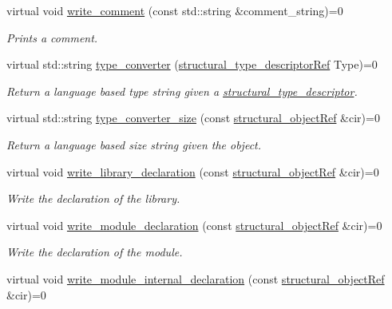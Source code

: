\begin{DoxyCompactItemize}
virtual void \hyperlink{classlanguage__writer_acb35eb2c22883fcf1f479a091dc4429d}{write\+\_\+comment} (const std\+::string \&comment\+\_\+string)=0
\begin{DoxyCompactList}\small\item\em Prints a comment. \end{DoxyCompactList}\item 
virtual std\+::string \hyperlink{classlanguage__writer_a1ac884fda2f8990edf61f914af7b04dd}{type\+\_\+converter} (\hyperlink{structural__objects_8hpp_a219296792577e3292783725961506c83}{structural\+\_\+type\+\_\+descriptor\+Ref} Type)=0
\begin{DoxyCompactList}\small\item\em Return a language based type string given a \hyperlink{structstructural__type__descriptor}{structural\+\_\+type\+\_\+descriptor}. \end{DoxyCompactList}\item 
virtual std\+::string \hyperlink{classlanguage__writer_a154f45ed77a5dff96d190b4e1ccfa366}{type\+\_\+converter\+\_\+size} (const \hyperlink{structural__objects_8hpp_a8ea5f8cc50ab8f4c31e2751074ff60b2}{structural\+\_\+object\+Ref} \&cir)=0
\begin{DoxyCompactList}\small\item\em Return a language based size string given the object. \end{DoxyCompactList}\item 
virtual void \hyperlink{classlanguage__writer_ab43debc2245af8078bb36b157d780aca}{write\+\_\+library\+\_\+declaration} (const \hyperlink{structural__objects_8hpp_a8ea5f8cc50ab8f4c31e2751074ff60b2}{structural\+\_\+object\+Ref} \&cir)=0
\begin{DoxyCompactList}\small\item\em Write the declaration of the library. \end{DoxyCompactList}\item 
virtual void \hyperlink{classlanguage__writer_a32b5b9395eb518430fca70b1d49ff133}{write\+\_\+module\+\_\+declaration} (const \hyperlink{structural__objects_8hpp_a8ea5f8cc50ab8f4c31e2751074ff60b2}{structural\+\_\+object\+Ref} \&cir)=0
\begin{DoxyCompactList}\small\item\em Write the declaration of the module. \end{DoxyCompactList}\item 
virtual void \hyperlink{classlanguage__writer_a3971d4b51e6c1762c29f8e0cb0a899f7}{write\+\_\+module\+\_\+internal\+\_\+declaration} (const \hyperlink{structural__objects_8hpp_a8ea5f8cc50ab8f4c31e2751074ff60b2}{structural\+\_\+object\+Ref} \&cir)=0

\end{DoxyCompactItemize}
